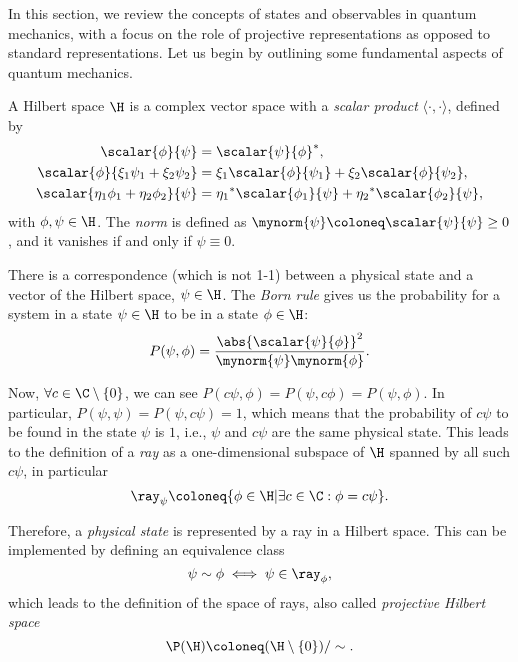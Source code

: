 In this section, we review the concepts of states and observables in quantum mechanics, with a focus on the role of projective representations as opposed to standard representations. Let us begin by outlining some fundamental aspects of quantum mechanics.

A Hilbert space $\H$ is a complex vector space with a \emph{scalar product} $\langle \cdot, \cdot \rangle$, defined by
    \begin{subequations}\label{eq:scalar-product}
        \begin{align}
        \scalar{\phi}{\psi} &= \scalar{\psi}{\phi}^* , \\
        \scalar{\phi}{\xi_1 \psi_1 + \xi_2 \psi_2} &= \xi_1 \scalar{\phi}{\psi_1} + \xi_2 \scalar{\phi}{\psi_2} ,\\
        \scalar{\eta_1 \phi_1 + \eta_2 \phi_2}{\psi} &= {\eta_1}^* \scalar{\phi_1}{\psi} + {\eta_2}^* \scalar{\phi_2}{\psi} ,
        \end{align}
        \end{subequations}
with $\phi,\psi \in \H$. The \emph{norm} is defined as $\mynorm{\psi} \coloneq \scalar{\psi}{\psi} \geq 0$, and it vanishes if and only if $\psi \equiv 0$.

There is a correspondence (which is not 1-1) between a physical state and a vector of the Hilbert space, $\psi \in \H$. The \emph{Born rule} gives us the probability for a system in a state $\psi \in \H$ to be in a state $\phi \in \H$:
\begin{equation}
    P(\psi, \phi) = \frac{\abs{\scalar{\psi}{\phi}}^2}{\mynorm{\psi}\mynorm{\phi}} .
\end{equation}

Now, $\forall c \in \C \setminus \{0\}$, we can see $P(c\psi, \phi) = P(\psi, c\phi) = P(\psi,\phi)$. In particular, $P(\psi,\psi) = P(\psi, c\psi) = 1$, which means that the probability of $c \psi$ to be found in the state $\psi$ is $1$, i.e., $\psi$ and $c\psi$ are the same physical state. This leads to the definition of a \emph{ray} as a one-dimensional subspace of $\H$ spanned by all such $c\psi$, in particular
\begin{equation}
    \ray_\psi \coloneq \{ \phi \in \H | \exists c \in \C : \phi = c \psi \} .
\end{equation}

Therefore, a \emph{physical state} is represented by a ray in a Hilbert space. This can be implemented by defining an equivalence class
\begin{equation}
    \psi \sim \phi \iff \psi \in \ray_\phi ,
\end{equation}
which leads to the definition of the space of rays, also called \emph{projective Hilbert space}
\begin{equation}
    \P(\H) \coloneq (\H \setminus \{0\}) / \sim .
\end{equation}

